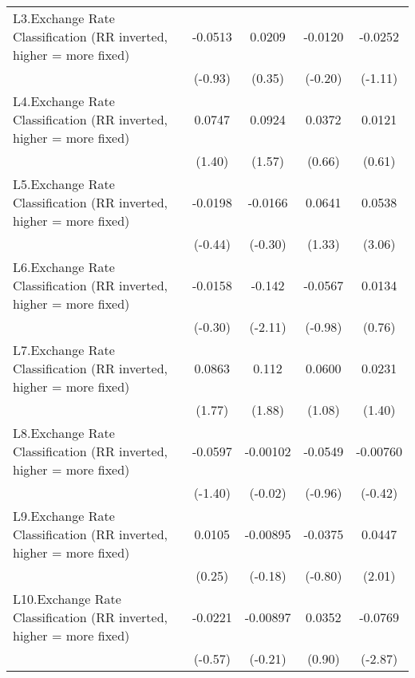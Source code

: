 {\begin{longtable}{l*{4}{c}}
\addlinespace
L3.Exchange Rate Classification (RR inverted, higher = more fixed)&  -0.0513         &   0.0209         &  -0.0120         &  -0.0252         \\
                &  (-0.93)         &   (0.35)         &  (-0.20)         &  (-1.11)         \\
\addlinespace
L4.Exchange Rate Classification (RR inverted, higher = more fixed)&   0.0747         &   0.0924         &   0.0372         &   0.0121         \\
                &   (1.40)         &   (1.57)         &   (0.66)         &   (0.61)         \\
\addlinespace
L5.Exchange Rate Classification (RR inverted, higher = more fixed)&  -0.0198         &  -0.0166         &   0.0641         &   0.0538\sym{**} \\
                &  (-0.44)         &  (-0.30)         &   (1.33)         &   (3.06)         \\
\addlinespace
L6.Exchange Rate Classification (RR inverted, higher = more fixed)&  -0.0158         &   -0.142\sym{*}  &  -0.0567         &   0.0134         \\
                &  (-0.30)         &  (-2.11)         &  (-0.98)         &   (0.76)         \\
\addlinespace
L7.Exchange Rate Classification (RR inverted, higher = more fixed)&   0.0863         &    0.112         &   0.0600         &   0.0231         \\
                &   (1.77)         &   (1.88)         &   (1.08)         &   (1.40)         \\
\addlinespace
L8.Exchange Rate Classification (RR inverted, higher = more fixed)&  -0.0597         & -0.00102         &  -0.0549         & -0.00760         \\
                &  (-1.40)         &  (-0.02)         &  (-0.96)         &  (-0.42)         \\
\addlinespace
L9.Exchange Rate Classification (RR inverted, higher = more fixed)&   0.0105         & -0.00895         &  -0.0375         &   0.0447\sym{*}  \\
                &   (0.25)         &  (-0.18)         &  (-0.80)         &   (2.01)         \\
\addlinespace
L10.Exchange Rate Classification (RR inverted, higher = more fixed)&  -0.0221         & -0.00897         &   0.0352         &  -0.0769\sym{**} \\
                &  (-0.57)         &  (-0.21)         &   (0.90)         &  (-2.87)         \\

\end{longtable}}
